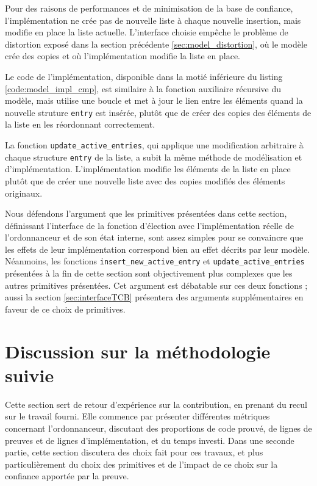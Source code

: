 		Pour des raisons de performances et de minimisation de la base de confiance, l'implémentation ne crée pas de nouvelle liste à chaque nouvelle insertion, mais modifie en place la liste actuelle. L'interface choisie empêche le problème de distortion exposé dans la section précédente \ref{sec:model_distortion}, où le modèle crée des copies et où l'implémentation modifie la liste en place.

		Le code de l'implémentation, disponible dans la motié inférieure du listing \ref{code:model_impl_cmp}, est similaire à la fonction auxiliaire récursive du modèle, mais utilise une boucle et met à jour le lien entre les éléments quand la nouvelle struture \texttt{entry} est insérée, plutôt que de créer des copies des éléments de la liste en les réordonnant correctement. 

		La fonction \texttt{update\_active\_entries}, qui applique une modification arbitraire à chaque structure \texttt{entry} de la liste, a subit la même méthode de modélisation et d'implémentation. L'implémentation modifie les éléments de la liste en place plutôt que de créer une nouvelle liste avec des copies modifiés des éléments originaux.

	\label{sec:implementation}

		Nous défendons l'argument que les primitives présentées dans cette section, définissant l'interface de la fonction d'élection avec l'implémentation réelle de l'ordonnanceur et de son état interne, sont assez simples pour se convaincre que les effets de leur implémentation correspond bien au effet décrits par leur modèle. Néanmoins, les fonctions \texttt{insert\_new\_active\_entry} et \texttt{update\_active\_entries} présentées à la fin de cette section sont objectivement plus complexes que les autres primitives présentées. Cet argument est débatable sur ces deux fonctions ; aussi la section \ref{sec:interfaceTCB} présentera des arguments supplémentaires en faveur de ce choix de primitives.

	\section{Discussion sur la méthodologie suivie}

		Cette section sert de retour d'expérience sur la contribution, en prenant du recul sur le travail fourni.
		Elle commence par présenter différentes métriques concernant l'ordonnanceur, discutant des proportions de code prouvé, de lignes de preuves et de lignes d'implémentation, et du temps investi. Dans une seconde partie, cette section discutera des choix fait pour ces travaux, et plus particulièrement du choix des primitives et de l'impact de ce choix sur la confiance apportée par la preuve.

